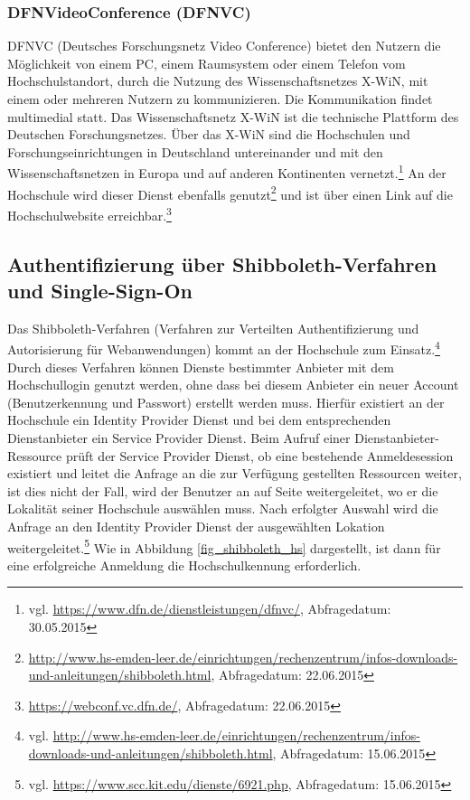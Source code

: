 \subsubsection{DFNVideoConference (DFNVC)}
DFNVC (Deutsches Forschungsnetz Video Conference) bietet den Nutzern die Möglichkeit von einem PC, einem Raumsystem oder einem Telefon vom Hochschulstandort, durch die Nutzung des Wissenschaftsnetzes X-WiN, mit einem oder mehreren Nutzern zu kommunizieren. Die Kommunikation findet multimedial statt. Das Wissenschaftsnetz X-WiN ist die technische Plattform des Deutschen Forschungsnetzes. Über das X-WiN sind die Hochschulen und Forschungseinrichtungen in Deutschland untereinander und mit den Wissenschaftsnetzen in Europa und auf anderen Kontinenten vernetzt.\footnote{vgl. \url{https://www.dfn.de/dienstleistungen/dfnvc/}, Abfragedatum: 30.05.2015} An der Hochschule wird dieser Dienst ebenfalls genutzt\footnote{\url{http://www.hs-emden-leer.de/einrichtungen/rechenzentrum/infos-downloads-und-anleitungen/shibboleth.html}, Abfragedatum: 22.06.2015} und ist über einen Link auf die Hochschulwebsite erreichbar.\footnote{\url{https://webconf.vc.dfn.de/}, Abfragedatum: 22.06.2015} 

\subsection{Authentifizierung über Shibboleth-Verfahren und Single-Sign-On}
\label{shibboleth_sso} 

Das Shibboleth-Verfahren (Verfahren zur Verteilten Authentifizierung und Autorisierung für Webanwendungen) kommt an der Hochschule zum Einsatz.\footnote{vgl. \url{http://www.hs-emden-leer.de/einrichtungen/rechenzentrum/infos-downloads-und-anleitungen/shibboleth.html}, Abfragedatum: 15.06.2015}  Durch dieses Verfahren können Dienste bestimmter Anbieter mit dem Hochschullogin genutzt werden, ohne dass bei diesem Anbieter ein neuer Account (Benutzerkennung und Passwort) erstellt werden muss. Hierfür existiert an der Hochschule ein Identity Provider Dienst und bei dem entsprechenden Dienstanbieter ein Service Provider Dienst.  Beim Aufruf einer Dienstanbieter-Ressource prüft der Service Provider Dienst, ob eine bestehende Anmeldesession existiert und leitet die Anfrage an die zur Verfügung gestellten Ressourcen weiter, ist dies nicht der Fall, wird der Benutzer an auf Seite weitergeleitet, wo er die Lokalität seiner Hochschule auswählen muss. Nach erfolgter Auswahl wird die Anfrage an den Identity Provider Dienst der ausgewählten Lokation weitergeleitet.\footnote{vgl. \url{https://www.scc.kit.edu/dienste/6921.php}, Abfragedatum: 15.06.2015} Wie in Abbildung \ref{fig_shibboleth_hs} dargestellt, ist dann für eine erfolgreiche Anmeldung die Hochschulkennung erforderlich.

